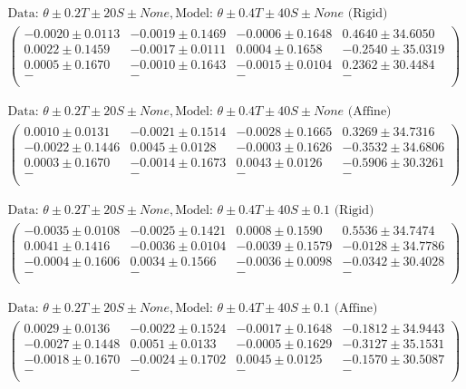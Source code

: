 \begin{align*}
\text{Data: }\theta\pm0.2 T\pm20 S\pm None, \text{Model: }\theta\pm0.4 T\pm40 S\pm None \text{ (Rigid)} \\
\begin{pmatrix}
-0.0020 \pm 0.0113 & -0.0019 \pm 0.1469 & -0.0006 \pm 0.1648 &  0.4640 \pm 34.6050 \\
 0.0022 \pm 0.1459 & -0.0017 \pm 0.0111 &  0.0004 \pm 0.1658 & -0.2540 \pm 35.0319 \\
 0.0005 \pm 0.1670 & -0.0010 \pm 0.1643 & -0.0015 \pm 0.0104 &  0.2362 \pm 30.4484 \\
 - &  - &  - &  - \\
\end{pmatrix}
\end{align*}

\begin{align*}
\text{Data: }\theta\pm0.2 T\pm20 S\pm None, \text{Model: }\theta\pm0.4 T\pm40 S\pm None \text{ (Affine)} \\
\begin{pmatrix}
 0.0010 \pm 0.0131 & -0.0021 \pm 0.1514 & -0.0028 \pm 0.1665 &  0.3269 \pm 34.7316 \\
-0.0022 \pm 0.1446 &  0.0045 \pm 0.0128 & -0.0003 \pm 0.1626 & -0.3532 \pm 34.6806 \\
 0.0003 \pm 0.1670 & -0.0014 \pm 0.1673 &  0.0043 \pm 0.0126 & -0.5906 \pm 30.3261 \\
 - &  - &  - &  - \\
\end{pmatrix}
\end{align*}

\begin{align*}
\text{Data: }\theta\pm0.2 T\pm20 S\pm None, \text{Model: }\theta\pm0.4 T\pm40 S\pm0.1 \text{ (Rigid)} \\
\begin{pmatrix}
-0.0035 \pm 0.0108 & -0.0025 \pm 0.1421 &  0.0008 \pm 0.1590 &  0.5536 \pm 34.7474 \\
 0.0041 \pm 0.1416 & -0.0036 \pm 0.0104 & -0.0039 \pm 0.1579 & -0.0128 \pm 34.7786 \\
-0.0004 \pm 0.1606 &  0.0034 \pm 0.1566 & -0.0036 \pm 0.0098 & -0.0342 \pm 30.4028 \\
 - &  - &  - &  - \\
\end{pmatrix}
\end{align*}

\begin{align*}
\text{Data: }\theta\pm0.2 T\pm20 S\pm None, \text{Model: }\theta\pm0.4 T\pm40 S\pm0.1 \text{ (Affine)} \\
\begin{pmatrix}
 0.0029 \pm 0.0136 & -0.0022 \pm 0.1524 & -0.0017 \pm 0.1648 & -0.1812 \pm 34.9443 \\
-0.0027 \pm 0.1448 &  0.0051 \pm 0.0133 & -0.0005 \pm 0.1629 & -0.3127 \pm 35.1531 \\
-0.0018 \pm 0.1670 & -0.0024 \pm 0.1702 &  0.0045 \pm 0.0125 & -0.1570 \pm 30.5087 \\
 - &  - &  - &  - \\
\end{pmatrix}
\end{align*}

